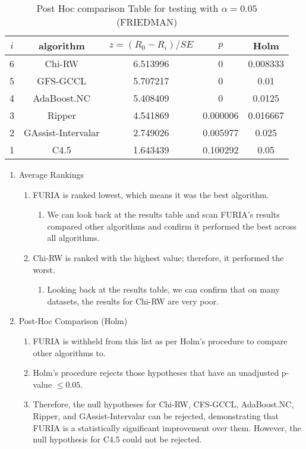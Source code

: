 \documentclass[a4paper,11pt]{article}
\begin{document}
\begin{table}[!htp]
\centering\footnotesize
\begin{tabular}{ccccc}
$i$&algorithm&$z=(R_0 - R_i)/SE$&$p$&Holm \\
\hline6& Chi-RW &6.513996&0&0.008333\\5& GFS-GCCL &5.707217&0&0.01\\4& AdaBoost.NC &5.408409&0&0.0125\\3& Ripper&4.541869&0.000006&0.016667\\2& GAssist-Intervalar &2.749026&0.005977&0.025\\1& C4.5 &1.643439&0.100292&0.05\\\hline
\end{tabular}
\caption{Post Hoc comparison Table for testing with $\alpha=0.05$ (FRIEDMAN)}
\end{table}

\begin{enumerate}
\item Average Rankings
\begin{enumerate}
\item FURIA is ranked lowest, which means it was the best algorithm.
\begin{enumerate}
\item We can look back at the results table and scan FURIA’s results compared other algorithms and confirm it performed the best across all algorithms.
\end{enumerate}
\item Chi-RW is ranked with the highest value; therefore, it performed the worst.
\begin{enumerate}
\item Looking back at the results table, we can confirm that on many datasets, the results for Chi-RW are very poor.
\end{enumerate}
\end{enumerate}
\item Post-Hoc Comparison (Holm)
\begin{enumerate}
\item FURIA is withheld from this list as per Holm’s procedure to compare other algorithms to.
\item Holm's procedure rejects those hypotheses that have an unadjusted p-value $\le0.05$.
\item Therefore, the null hypotheses for Chi-RW, CFS-GCCL, AdaBoost.NC, Ripper, and GAssist-Intervalar can be rejected, demonstrating that FURIA is a statistically significant improvement over them. However, the null hypothesis for C4.5 could not be rejected.
\end{enumerate}
\end{enumerate}
\end{document}
